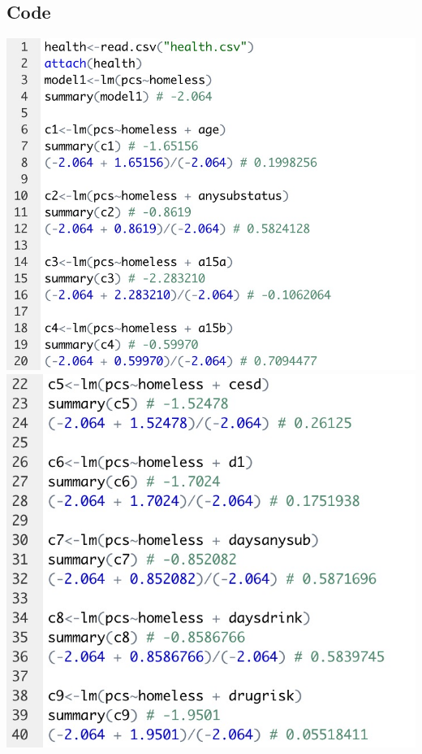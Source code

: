 \documentclass{report}
\begin{document}
\subsection{Code}
\includegraphics[scale=0.3]{a.jpeg}\\
\includegraphics[scale=0.3]{b.jpeg}\\
\end{document}
